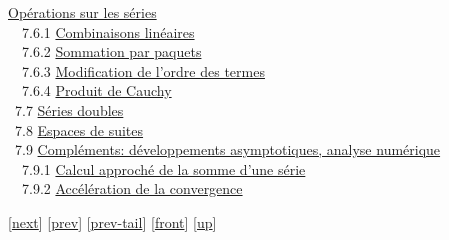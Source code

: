 \documentclass[]{article}
\begin{document}
\href{coursse40.html\#x50-2260007.6}{Opérations sur les séries} \\
~~7.6.1 \href{coursse40.html\#x50-2270007.6.1}{Combinaisons linéaires}
\\ ~~7.6.2 \href{coursse40.html\#x50-2280007.6.2}{Sommation par paquets}
\\ ~~7.6.3 \href{coursse40.html\#x50-2290007.6.3}{Modification de
l'ordre des termes} \\ ~~7.6.4
\href{coursse40.html\#x50-2300007.6.4}{Produit de Cauchy} \\ ~7.7
\href{coursse41.html\#x51-2310007.7}{Séries doubles} \\ ~7.8
\href{coursse42.html\#x52-2320007.8}{Espaces de suites} \\ ~7.9
\href{coursse43.html\#x53-2330007.9}{Compléments: développements
asymptotiques, analyse numérique} \\ ~~7.9.1
\href{coursse43.html\#x53-2340007.9.1}{Calcul approché de la somme d'une
série} \\ ~~7.9.2 \href{coursse43.html\#x53-2350007.9.2}{Accélération de
la convergence}

{[}\href{coursch9.html}{next}{]} {[}\href{coursch7.html}{prev}{]}
{[}\href{coursch7.html\#tailcoursch7.html}{prev-tail}{]}
{[}\href{coursch8.html}{front}{]}
{[}\href{cours.html\#coursch8.html}{up}{]}
\end{document}
